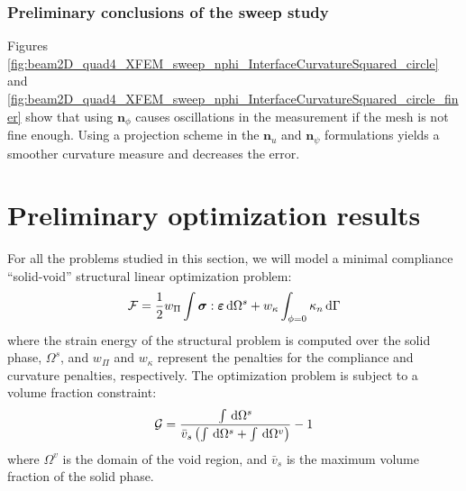 
\subsubsection{Preliminary conclusions of the sweep study}
\label{sec:sweep_study_conclusions}

Figures \ref{fig:beam2D_quad4_XFEM_sweep_nphi_InterfaceCurvatureSquared_circle} and \ref{fig:beam2D_quad4_XFEM_sweep_nphi_InterfaceCurvatureSquared_circle_finer} show that using $\mathbf{n}_{\phi}$ causes oscillations in the measurement if the mesh is not fine enough. Using a projection scheme in the $\mathbf{n}_{u}$ and $\mathbf{n}_{\psi}$ formulations yields a smoother curvature measure and decreases the error.

\section{Preliminary optimization results}
\label{sec:optimization_results}

For all the problems studied in this section, we will model a minimal compliance ``solid-void'' structural linear optimization problem:
%
\begin{equation}
	\centering
	\label{eq:curvature_optimization_objective}
	\mathcal{F} = \frac{1}{2} w_{\Pi} \int \boldsymbol{\sigma} : \boldsymbol{\varepsilon} \,\mathrm{d}\Omega^{s} + w_{\kappa} \int_{\phi=0} \kappa_{n} \,\mathrm{d}\Gamma
\end{equation}
%
where the strain energy of the structural problem is computed over the solid phase, $\Omega^{s}$, and $w_{\Pi}$ and $w_{\kappa}$ represent the penalties for the compliance and curvature penalties, respectively. The optimization problem is subject to a volume fraction constraint:
%
\begin{equation}
	\centering
	\label{eq:curvature_optimization_constraint}
	\mathcal{G} = \frac{\int \,\mathrm{d}\Omega^{s}}{\bar{v}_{s}\left(\int \,\mathrm{d}\Omega^{s} + \int \,\mathrm{d}\Omega^{v} \right)} - 1
\end{equation}
%
where $\Omega^{v}$ is the domain of the void region, and $\bar{v}_{s}$ is the maximum volume fraction of the solid phase.

